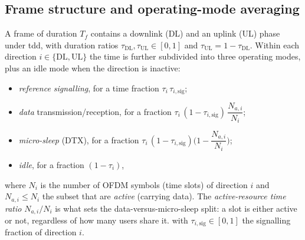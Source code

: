 \subsection{Frame structure and operating-mode averaging}
\label{sec:frame}
A frame of duration $T_f$ contains a downlink (DL) and an uplink (UL) phase
under \gls{tdd}, with duration ratios $\tau_{\mathrm{DL}},\tau_{\mathrm{UL}}\in[0,1]$
and $\tau_{\mathrm{UL}}=1-\tau_{\mathrm{DL}}$. Within each direction
$i\in\{\mathrm{DL},\mathrm{UL}\}$ the time is further subdivided into three
operating modes, plus an idle mode when the direction is inactive:
\begin{itemize}
  \item \emph{reference signalling}, for a time fraction
        $\tau_i\,\tau_{i,\mathrm{sig}}$;
  \item \emph{data} transmission/reception, for a fraction
        $\tau_i\,(1-\tau_{i,\mathrm{sig}})\,\dfrac{N_{a,i}}{N_i}$;
  \item \emph{micro-sleep} (DTX), for a fraction
        $\tau_i\,(1-\tau_{i,\mathrm{sig}})\Big(1-\dfrac{N_{a,i}}{N_i}\Big)$;
  \item \emph{idle}, for a fraction $(1-\tau_i)$,
\end{itemize}
where $N_i$ is the number of OFDM symbols (time slots) of direction $i$ and
$N_{a,i}\le N_i$ the subset that are \emph{active} (carrying data). The
\emph{active-resource time ratio} $N_{a,i}/N_i$ is what sets the
data-versus-micro-sleep split: a slot is either active or not, regardless of how
many users share it.
with $\tau_{i,\mathrm{sig}}\in[0,1]$ the signalling fraction of direction $i$.

